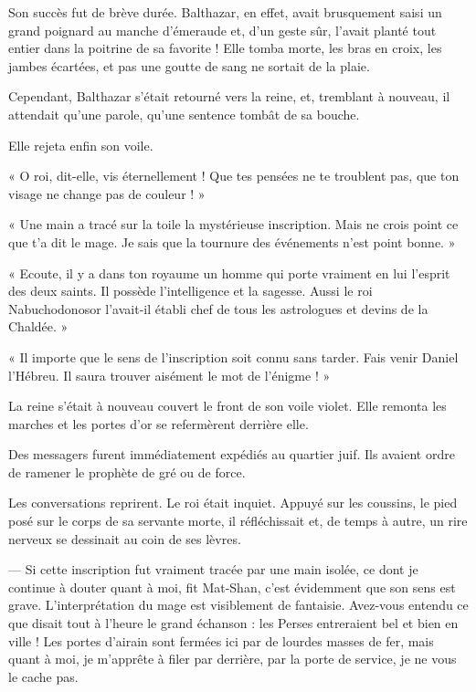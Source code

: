 \documentclass[a4paper, 11pt, oneside, polutonikogreek, french]{article}
\begin{document}
Son succès fut de brève durée. Balthazar, en effet, avait brusquement saisi un grand poignard au manche d'émeraude et, d'un geste sûr, l'avait planté tout entier dans la poitrine de sa favorite ! Elle tomba morte, les bras en croix, les jambes écartées, et pas une goutte de sang ne sortait de la plaie.

Cependant, Balthazar s'était retourné vers la reine, et, tremblant à nouveau, il attendait qu'une parole, qu'une sentence tombât de sa bouche.

Elle rejeta enfin son voile.

« O roi, dit-elle, vis éternellement ! Que tes pensées ne te troublent pas, que ton visage ne change pas de couleur ! »

« Une main a tracé sur la toile la mystérieuse inscription. Mais ne crois point ce que t'a dit le mage. Je sais que la tournure des événements n'est point bonne. »

« Ecoute, il y a dans ton royaume un homme qui porte vraiment en lui l'esprit des deux saints. Il possède l'intelligence et la sagesse. Aussi le roi Nabuchodonosor l'avait-il établi chef de tous les astrologues et devins de la Chaldée. »

« Il importe que le sens de l'inscription soit connu sans tarder. Fais venir Daniel l'Hébreu. Il saura trouver aisément le mot de l'énigme ! »

La reine s'était à nouveau couvert le front de son voile violet. Elle remonta les marches et les portes d'or se refermèrent derrière elle.

\bigskip
\centerline{\EightStarTaper}
\centerline{\EightStarTaper\EightStarTaper}
\bigskip

Des messagers furent immédiatement expédiés au quartier juif. Ils avaient ordre de ramener le prophète de gré ou de force.

Les conversations reprirent. Le roi était inquiet. Appuyé sur les coussins, le pied posé sur le corps de sa servante morte, il réfléchissait et, de temps à autre, un rire nerveux se dessinait au coin de ses lèvres.

--- Si cette inscription fut vraiment tracée par une main isolée, ce dont je continue à douter quant à moi, fit Mat-Shan, c'est évidemment que son sens est grave. L'interprétation du mage est visiblement de fantaisie. Avez-vous entendu ce que disait tout à l'heure le grand échanson : les Perses entreraient bel et bien en ville ! Les portes d'airain sont fermées ici par de lourdes masses de fer, mais quant à moi, je m'apprête à filer par derrière, par la porte de service, je ne vous le cache pas.
\end{document}

